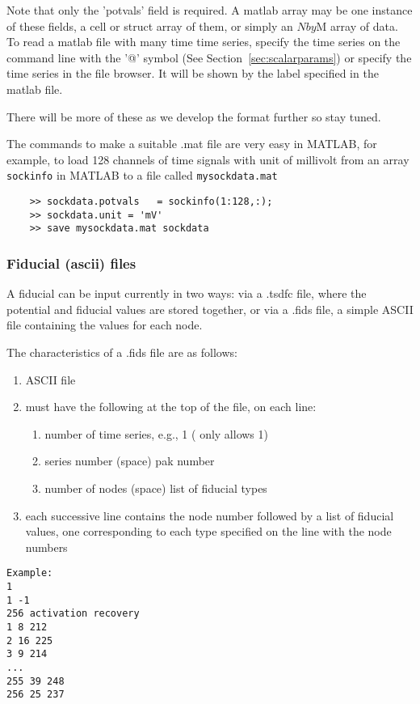 Note that only the 'potvals' field is required.  A matlab array may 
be one instance of these fields, a cell or struct array of them, or 
simply an $N by $M array of data.  To read a matlab file with many time
time series, specify the time series on the command line with the '@' symbol
(See Section~\ref{sec:scalarparams}) or specify the time series in the 
file browser.  It will be shown by the label specified in the matlab file.

%
There will be more of these as we develop the format further so stay
tuned. 

The commands to make a suitable .mat file are very easy in MATLAB, for
example, to load 128 channels of time signals with unit of millivolt from
an array \texttt{sockinfo} in MATLAB to a file called
\texttt{mysockdata.mat}
%
\begin{verbatim}
    >> sockdata.potvals   = sockinfo(1:128,:);
    >> sockdata.unit = 'mV'
    >> save mysockdata.mat sockdata
\end{verbatim}

\subsubsection{Fiducial (ascii) files}
\label{sec:fidfiles}

A fiducial can be input currently in two ways: via a .tsdfc file, where the
potential and fiducial values are stored together, or via a .fids file,
a simple ASCII file containing the values for each node.

The characteristics of a .fids file are as follows:
\begin{enumerate}
  \item ASCII file
  \item must have the following at the top of the file, on each line:
  \begin{enumerate}
    \item number of time series, e.g., 1 (\map{} only allows 1)
    \item series number (space) pak number
    \item number of nodes (space) list of fiducial types
  \end{enumerate}
  \item each successive line contains the node number followed by
        a list of fiducial values, one corresponding to each
        type specified on the line with the node numbers
\end{enumerate}

\begin{verbatim}
Example:
1
1 -1
256 activation recovery
1 8 212
2 16 225
3 9 214
...
255 39 248
256 25 237  
\end{verbatim}


